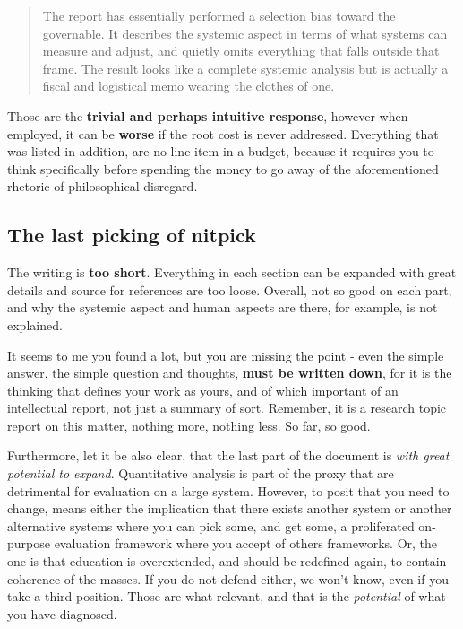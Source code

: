 \documentclass[10pt,a4paper]{article}
\begin{document}
\begin{quote}
    The report has essentially performed a selection bias toward the governable. It describes the systemic aspect in terms of what systems can measure and adjust, and quietly omits everything that falls outside that frame. The result looks like a complete systemic analysis but is actually a fiscal and logistical memo wearing the clothes of one.
\end{quote}

Those are the \textbf{trivial and perhaps intuitive response}, however when employed, it can be \textbf{worse} if the root cost is never addressed. Everything that was listed in addition, are no line item in a budget, because it requires you to think specifically before spending the money to go away of the aforementioned rhetoric of philosophical disregard. 

\subsection{The last picking of nitpick}

The writing is \textbf{too short}. Everything in each section can be expanded with great details and source for references are too loose. Overall, not so good on each part, and why the systemic aspect and human aspects are there, for example, is not explained. 

It seems to me you found a lot, but you are missing the point - even the simple answer, the simple question and thoughts, \textbf{must be written down}, for it is the thinking that defines your work as yours, and of which important of an intellectual report, not just a summary of sort. Remember, it is a research topic report on this matter, nothing more, nothing less. So far, so good. 

Furthermore, let it be also clear, that the last part of the document is \textit{with great potential to expand}. Quantitative analysis is part of the proxy that are detrimental for evaluation on a large system. However, to posit that you need to change, means either the implication that there exists another system or another alternative systems where you can pick some, and get some, a proliferated on-purpose evaluation framework where you accept of others frameworks. Or, the one is that education is overextended, and should be redefined again, to contain coherence of the masses. If you do not defend either, we won't know, even if you take a third position. Those are what relevant, and that is the \textit{potential} of what you have diagnosed. 
\end{document}
